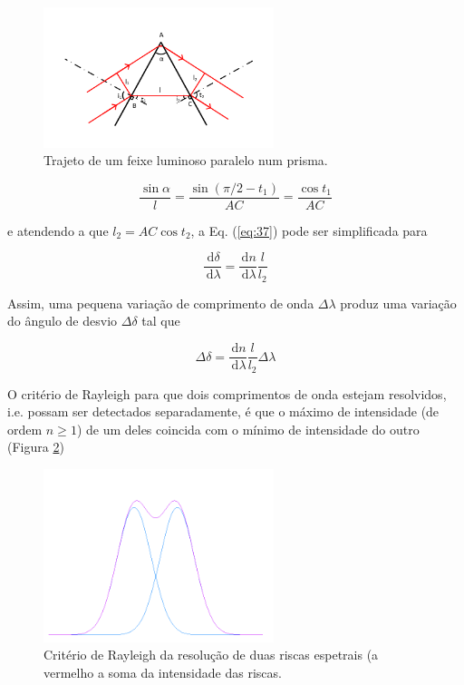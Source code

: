 \documentclass[a4paper,12pt]{article}  %
\newcommand{\ud}{\,\mathrm{d}}
\begin{document}
\begin{figure}[!htb]  \centering 
	\includegraphics[width=0.6\textwidth]{feixe}
	\caption{Trajeto de um feixe luminoso paralelo num prisma. \label{fig:feixe}} 
\end{figure}

\begin{equation}
	\label{eq:sin_alpha}
	\frac{\sin \alpha}{l}= \frac{\sin (\pi/2 - t_1)} {AC}=\frac{\cos t_1} {AC}
\end{equation}

e atendendo a que $l_2= AC \cos t_2$, a Eq. (\ref{eq:37}) pode ser simplificada para 

\begin{equation}
	\label{eq:delt_lamd}
	\frac{\ud \delta}{\ud \lambda}  =  \frac{\ud n}{\ud \lambda} \frac{l}{l_2}
\end{equation}

Assim, uma pequena variação de comprimento de onda $\Delta \lambda$ produz uma variação do ângulo de desvio $\Delta \delta$  tal que 

\begin{equation}
	\label{eq:Delt_delta}
	\Delta \delta =  \frac{\ud n}{\ud \lambda} \frac{l}{l_2} \Delta \lambda 
\end{equation}

O critério de Rayleigh para que dois comprimentos de onda estejam resolvidos, i.e. possam ser detectados separadamente, é que o máximo de intensidade (de ordem $n \ge 1$) de um deles coincida com o mínimo de intensidade do outro (Figura \ref{fig:gauss})

\begin{figure}[ht]  \centering 
	\includegraphics[width=0.6\textwidth]{gauss}
	\caption{Critério de Rayleigh da resolução de duas riscas espetrais (a vermelho a soma da intensidade das riscas. \label{fig:gauss}} 
\end{figure}
\end{document}
